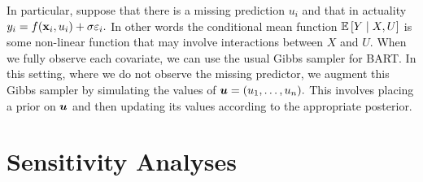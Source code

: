 \documentclass[12pt]{article}
\begin{document}
In particular, suppose that there is a missing prediction $u_{i}$ and that in actuality $y_{i} = f(\mathbf{x}_{i}, u_{i}) + \sigma\varepsilon_{i}.$
In other words the conditional mean function $\mathbb{E}\left[Y \mid X, U\right]$ is some non-linear function that may involve interactions between $X$ and $U.$
When we fully observe each covariate, we can use the usual Gibbs sampler for BART.
In this setting, where we do not observe the missing predictor, we augment this Gibbs sampler by simulating the values of $\boldsymbol{u} = (u_{1}, \ldots, u_{n}).$
This involves placing a prior on $\boldsymbol{u}$ and then updating its values according to the appropriate posterior.


\section{Sensitivity Analyses}
\label{sec:sensitivity_analyses}
\end{document}
